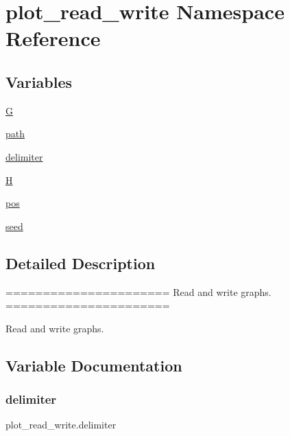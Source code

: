 \hypertarget{namespaceplot__read__write}{}\section{plot\+\_\+read\+\_\+write Namespace Reference}
\label{namespaceplot__read__write}
\subsection*{Variables}
\begin{DoxyCompactItemize}
\item 
\hyperlink{namespaceplot__read__write_a6a13d9069018b3fdd5dbd4d31683c587}{G}
\item 
\hyperlink{namespaceplot__read__write_a3fd3edc91a1dcb1873450e3885f72ea1}{path}
\item 
\hyperlink{namespaceplot__read__write_a9988a6a567b232f6b4c013cb8dad209f}{delimiter}
\item 
\hyperlink{namespaceplot__read__write_ac72f0bfcfd5b7d6d59f4c42547c7dcb0}{H}
\item 
\hyperlink{namespaceplot__read__write_a1f0b3aa9573e52c297f50828d842c6c3}{pos}
\item 
\hyperlink{namespaceplot__read__write_af523075dfda0838a4f74dc2d920c69a4}{seed}
\end{DoxyCompactItemize}


\subsection{Detailed Description}
\begin{DoxyVerb}======================
Read and write graphs.
======================

Read and write graphs.
\end{DoxyVerb}
 

\subsection{Variable Documentation}
\mbox{\label{namespaceplot__read__write_a9988a6a567b232f6b4c013cb8dad209f}} 
\subsubsection{\texorpdfstring{delimiter}{delimiter}}
{\footnotesize\ttfamily plot\+\_\+read\+\_\+write.\+delimiter}

